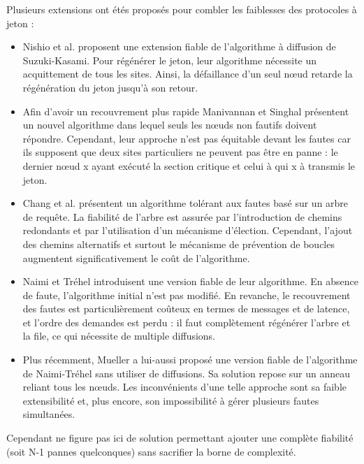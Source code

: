 Plusieurs extensions ont étés proposés pour combler les faiblesses des protocoles à jeton :

\begin{itemize} 
\item Nishio et al. proposent une extension fiable de l'algorithme à diffusion de Suzuki-Kasami. Pour régénérer le jeton, leur algorithme nécessite un acquittement de tous les sites. Ainsi, la défaillance d'un seul nœud retarde la régénération du jeton jusqu'à son retour. 
\item Afin d'avoir un recouvrement plus rapide Manivannan et Singhal présentent un nouvel algorithme dans lequel seuls les nœuds non fautifs doivent répondre. Cependant, leur approche n'est pas équitable devant les fautes car ils supposent que deux sites particuliers ne peuvent pas être en panne : le dernier nœud x ayant exécuté la section critique et celui à qui x à transmis le jeton.
\item Chang et al. présentent un algorithme tolérant aux fautes basé sur un arbre de requête. La fiabilité de l'arbre est assurée par l'introduction de chemins redondants et par l'utilisation d'un mécanisme d'élection. Cependant, l'ajout des chemins alternatifs et surtout le mécanisme de prévention de boucles augmentent significativement le coût de l'algorithme.
\item Naimi et Tréhel introduisent une version fiable de leur algorithme. En absence de faute, l'algorithme initial n'est pas modifié. En revanche, le recouvrement des fautes est particulièrement coûteux en termes de messages et de latence, et l'ordre des demandes est perdu : il faut complètement régénérer l'arbre et la file, ce qui nécessite de multiple diffusions. 
\item Plus récemment, Mueller a lui-aussi proposé une version fiable de l'algorithme de Naimi-Tréhel sans utiliser de diffusions. Sa solution repose sur un anneau reliant tous les nœuds.
Les inconvénients d'une telle approche sont sa faible extensibilité et, plus encore, son impossibilité à gérer plusieurs fautes simultanées.
\end{itemize}

Cependant ne figure pas ici de solution permettant ajouter une complète fiabilité (soit N-1 pannes quelconques) sans sacrifier la borne de complexité.